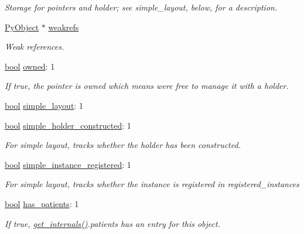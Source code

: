 \begin{DoxyCompactItemize}
\begin{tabbing}
\end{tabbing}\begin{DoxyCompactList}\small\item\em Storage for pointers and holder; see simple\+\_\+layout, below, for a description. \end{DoxyCompactList}\item 
\mbox{\hyperlink{_python27_2object_8h_aadc84ac7aed2cfa6f20c25f62bf3dac7}{Py\+Object}} $\ast$ \mbox{\hyperlink{structinstance_a23dd4c6144dbfa8ed0ba6d2a7a964998}{weakrefs}}
\begin{DoxyCompactList}\small\item\em Weak references. \end{DoxyCompactList}\item 
\mbox{\hyperlink{asdl_8h_af6a258d8f3ee5206d682d799316314b1}{bool}} \mbox{\hyperlink{structinstance_a69b3e638c182ecbbaaa5625ce3c36e99}{owned}}\+: 1
\begin{DoxyCompactList}\small\item\em If true, the pointer is owned which means we\textquotesingle{}re free to manage it with a holder. \end{DoxyCompactList}\item 
\mbox{\hyperlink{asdl_8h_af6a258d8f3ee5206d682d799316314b1}{bool}} \mbox{\hyperlink{structinstance_a1e23897fd281cdd5cecd2d36b5d7a26d}{simple\+\_\+layout}}\+: 1
\item 
\mbox{\hyperlink{asdl_8h_af6a258d8f3ee5206d682d799316314b1}{bool}} \mbox{\hyperlink{structinstance_a70b19567d7738df6679e1599e7d3ff75}{simple\+\_\+holder\+\_\+constructed}}\+: 1
\begin{DoxyCompactList}\small\item\em For simple layout, tracks whether the holder has been constructed. \end{DoxyCompactList}\item 
\mbox{\hyperlink{asdl_8h_af6a258d8f3ee5206d682d799316314b1}{bool}} \mbox{\hyperlink{structinstance_a464df414f8c21853c43be0ab4ccf8e93}{simple\+\_\+instance\+\_\+registered}}\+: 1
\begin{DoxyCompactList}\small\item\em For simple layout, tracks whether the instance is registered in {\ttfamily registered\+\_\+instances} \end{DoxyCompactList}\item 
\mbox{\hyperlink{asdl_8h_af6a258d8f3ee5206d682d799316314b1}{bool}} \mbox{\hyperlink{structinstance_a30d2da1bf481e5628e3f20a84a4bcd1a}{has\+\_\+patients}}\+: 1
\begin{DoxyCompactList}\small\item\em If true, \mbox{\hyperlink{internals_8h_a04a9d4c2d4a027e104437cce54c0cc5f}{get\+\_\+internals()}}.patients has an entry for this object. \end{DoxyCompactList}\end{DoxyCompactItemize}
